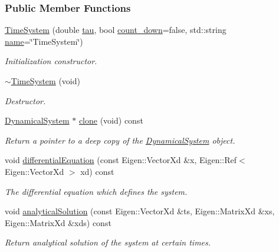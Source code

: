 \subsubsection*{Public Member Functions}
\begin{DoxyCompactItemize}
\item 
\hyperlink{classDmpBbo_1_1TimeSystem_a54efa9f53ff3d908c1b401b8b7e74ef2}{Time\+System} (double \hyperlink{group__DynamicalSystems_ga50eec7ad4c9664b5809ace45b22200d5}{tau}, bool \hyperlink{classDmpBbo_1_1TimeSystem_acb6f561fe702566189e7b5ef7f2d9bca}{count\+\_\+down}=false, std\+::string \hyperlink{group__DynamicalSystems_gacd23346c798f78014a4f82c853e83c88}{name}=\char`\"{}Time\+System\char`\"{})
\begin{DoxyCompactList}\small\item\em Initialization constructor. \end{DoxyCompactList}\item 
\hyperlink{classDmpBbo_1_1TimeSystem_a6eb633f00bc3c52520e10a3564ef7d9f}{$\sim$\+Time\+System} (void)
\begin{DoxyCompactList}\small\item\em Destructor. \end{DoxyCompactList}\item 
\hyperlink{classDmpBbo_1_1DynamicalSystem}{Dynamical\+System} $\ast$ \hyperlink{classDmpBbo_1_1TimeSystem_a16b3e8da712b58f8295cbb7951bebf68}{clone} (void) const 
\begin{DoxyCompactList}\small\item\em Return a pointer to a deep copy of the \hyperlink{classDmpBbo_1_1DynamicalSystem}{Dynamical\+System} object. \end{DoxyCompactList}\item 
void \hyperlink{classDmpBbo_1_1TimeSystem_ab564468764e7e4dc7c11e2a786e22c19}{differential\+Equation} (const Eigen\+::\+Vector\+Xd \&x, Eigen\+::\+Ref$<$ Eigen\+::\+Vector\+Xd $>$ xd) const 
\begin{DoxyCompactList}\small\item\em The differential equation which defines the system. \end{DoxyCompactList}\item 
void \hyperlink{classDmpBbo_1_1TimeSystem_ab6600b58b35bc9e66673d16f68e2e919}{analytical\+Solution} (const Eigen\+::\+Vector\+Xd \&ts, Eigen\+::\+Matrix\+Xd \&xs, Eigen\+::\+Matrix\+Xd \&xds) const 
\begin{DoxyCompactList}\small\item\em Return analytical solution of the system at certain times. \end{DoxyCompactList}\item 

\end{DoxyCompactItemize}
